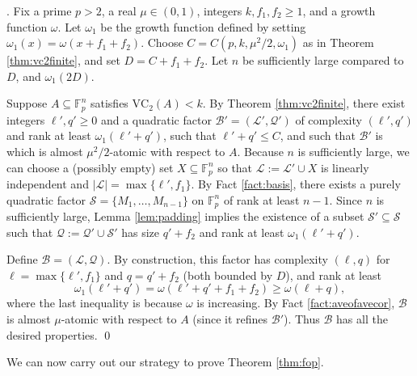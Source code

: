 \documentclass[12pt,oneside,british,a4wide]{amsart}
\numberwithin{equation}{section}
\theoremstyle{definition}
\def\F{\mathbb{F}}
\def\VC{\mathrm{VC}}
\newcommand{\calL}{\mathcal{L}}
\newcommand{\calB}{\mathcal{B}}
\newcommand{\calQ}{\mathcal{Q}}
\newcommand{\calS}{\mathcal{S}}
\newenvironment{proofof}[1]{\indent{\itshape Proof of #1}.\;}{\qed}
\begin{document}
\begin{proofof}{Theorem \ref{thm:quadlb}} Fix a prime $p>2$, a real $\mu\in (0,1)$, integers $k,f_1,f_2\geq 1$, and a growth function $\omega$.  Let $\omega_1$ be the growth function defined by  setting $\omega_1(x)= \omega(x+f_1+f_2)$.  Choose  $C=C(p,k, \mu^2/2,\omega_1)$ as in Theorem \ref{thm:vc2finite}, and set $D=C+f_1+f_2$.  Let $n$ be sufficiently large compared to $D$, and $\omega_1(2D)$.

Suppose $A\subseteq \F_p^n$ satisfies $\VC_2(A)<k$.  By Theorem \ref{thm:vc2finite}, there exist integers $\ell',q'\geq 0$ and a quadratic factor $\calB'=(\calL',\calQ')$ of complexity $(\ell',q')$ and rank at least $\omega_1(\ell'+q')$, such that $\ell'+q'\leq C$, and such that $\calB'$ is which is almost $\mu^2/2$-atomic with respect to $A$.  Because $n$ is sufficiently large, we can choose   a  (possibly empty) set $X\subseteq \F_p^n$ so that $\calL:=\calL'\cup X$ is linearly independent and $ |\calL|= \max\{\ell',f_1\}$.    By Fact \ref{fact:basis}, there exists a purely quadratic factor $\calS=\{M_1,\ldots, M_{n-1}\}$ on $\F_p^n$ of rank at least $n-1$.   Since $n$ is sufficiently large,  Lemma \ref{lem:padding} implies the existence of a subset $\calS'\subseteq \calS$ such that  $\calQ:=\calQ'\cup \calS'$ has size $q'+f_2$ and rank at least $\omega_1(\ell'+q')$.   

Define $\calB=(\calL,\calQ)$. By construction, this factor has complexity $(\ell,q)$ for $\ell=\max\{\ell',f_1\}$ and $q=q'+f_2$ (both bounded by $D$), and rank at least 
$$
\omega_1(\ell'+q')=\omega(\ell'+q'+f_1+f_2)\geq \omega(\ell+q),
$$
where the last inequality is because $\omega$ is increasing.  By Fact \ref{fact:aveofavecor}, $\calB$ is almost $\mu$-atomic with respect to $A$ (since it refines $\calB'$). Thus $\calB$ has all the desired properties.
\end{proofof}

\vspace{2mm}


We can now carry out our strategy to prove Theorem \ref{thm:fop}.
\vspace{2mm}
\end{document}
